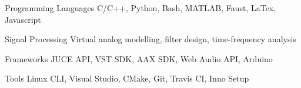 

\begin{cvskills}

    \cvskill
    {Programming Languages} %
    {C/C++, Python, Bash, MATLAB, Faust, LaTex, Javascript} %

    \cvskill
    {Signal Processing} %
    {Virtual analog modelling, filter design, time-frequency analysis} %

    \cvskill
    {Frameworks} %
    {JUCE API, VST SDK, AAX SDK, Web Audio API, Arduino} %

    \cvskill
    {Tools} %
    {Linux CLI, Visual Studio, CMake, Git, Travis CI, Inno Setup} %

\end{cvskills}
